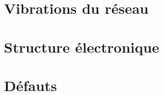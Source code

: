 \documentclass[a4paper,justified,twoside,nobib]{tufte-book}
\renewcommand{\=}[1]{\stackrel{#1}{=}} %
\begin{document}



%
%



\part[VIBRATIONS DU RÉSEAU]{Vibrations du réseau}



%
%

    \part[STRUCTURE ÉLECTRONIQUE]{Structure électronique}
%
%    
    
    
    
%    
%
%
    \part[DÉFAUTS]{Défauts}
%
    
    
    
%    
%    
%
\end{document}
